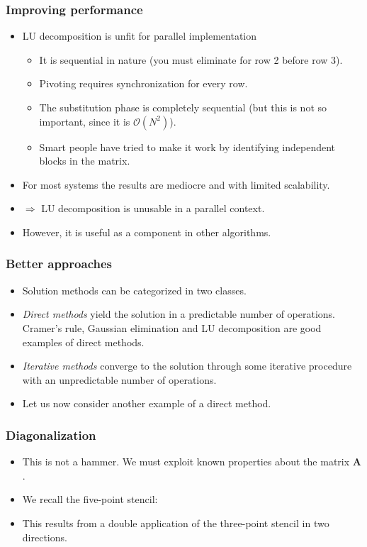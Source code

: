 \begin{frame}
  \frametitle{Improving performance}
  \begin{itemize}
  \item LU decomposition is unfit for parallel implementation
    \begin{itemize}
    \item It is sequential in nature (you must eliminate for row 2 before row
      3).
    \item Pivoting requires synchronization for every row.
    \item The substitution phase is completely sequential (but this is not so
      important, since it is $\mathcal{O}(N^2)$).
    \item Smart people have tried to make it work by identifying independent
      blocks in the matrix.
    \end{itemize}
  \item For most systems the results are mediocre and with limited scalability.
  \item $\Rightarrow$ LU decomposition is unusable in a parallel context.
  \item However, it is useful as a component in other algorithms.
  \end{itemize}
\end{frame}

\begin{frame}
  \frametitle{Better approaches}
  \begin{itemize}
  \item Solution methods can be categorized in two classes.
  \item \emph{Direct methods} yield the solution in a predictable number of
    operations. Cramer's rule, Gaussian elimination and LU decomposition are
    good examples of direct methods.
  \item \emph{Iterative methods} converge to the solution through some iterative
    procedure with an unpredictable number of operations.
  \item Let us now consider another example of a direct method.
  \end{itemize}
\end{frame}

\begin{frame}
  \frametitle{Diagonalization}
  \begin{itemize}
  \item This is not a hammer. We must exploit known properties about the matrix
    $\bm A$.
  \item We recall the five-point stencil:
    \begin{center}
      \scalebox{0.5}{}
    \end{center}
  \item This results from a double application of the three-point stencil in two
    directions.
    \begin{center}
      \scalebox{0.5}{}
    \end{center}
  \end{itemize}
\end{frame}

